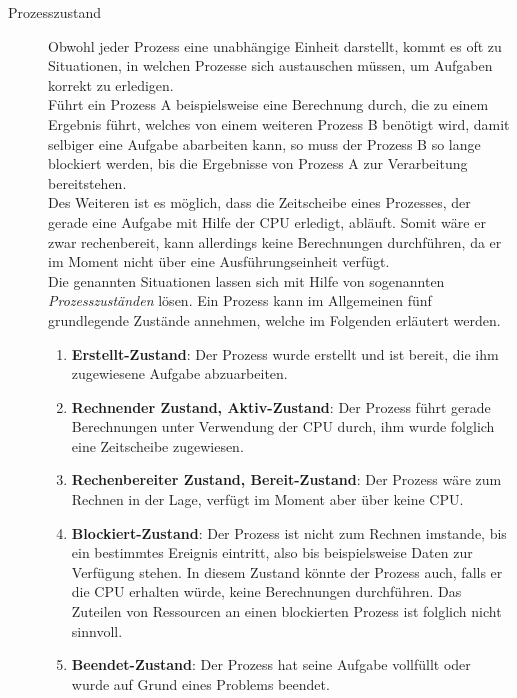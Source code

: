 				\begin{description}
					\item[Prozesszustand]
						\label{Prozesszustand}
						
						Obwohl jeder Prozess eine unabhängige Einheit darstellt, kommt es oft zu Situationen, in welchen Prozesse sich austauschen müssen, um Aufgaben korrekt zu erledigen.\\
						Führt ein Prozess A beispielsweise eine Berechnung durch, die zu einem Ergebnis führt, welches von einem weiteren Prozess B benötigt wird, damit selbiger eine Aufgabe abarbeiten kann, so muss der Prozess B so lange blockiert werden, bis die Ergebnisse von Prozess A zur Verarbeitung bereitstehen.\\
						Des Weiteren ist es möglich, dass die Zeitscheibe eines Prozesses, der gerade eine Aufgabe mit Hilfe der CPU erledigt, abläuft. Somit wäre er zwar rechenbereit, kann allerdings keine Berechnungen durchführen, da er im Moment nicht über eine Ausführungseinheit verfügt.\\
						Die genannten Situationen lassen sich mit Hilfe von sogenannten \textit{Prozesszuständen} lösen. Ein Prozess kann im Allgemeinen fünf grundlegende Zustände annehmen, welche im Folgenden erläutert werden.
						
						\begin{enumerate}
							\item \textbf{Erstellt-Zustand}: Der Prozess wurde erstellt und ist bereit, die ihm zugewiesene Aufgabe abzuarbeiten.
							\item \textbf{Rechnender Zustand, Aktiv-Zustand}: Der Prozess führt gerade Berechnungen unter Verwendung der CPU durch, ihm wurde folglich eine Zeitscheibe zugewiesen.
							\item \textbf{Rechenbereiter Zustand, Bereit-Zustand}: Der Prozess wäre zum Rechnen in der Lage, verfügt im Moment aber über keine CPU.
							\item \textbf{Blockiert-Zustand}: Der Prozess ist nicht zum Rechnen imstande, bis ein bestimmtes Ereignis eintritt, also bis beispielsweise Daten zur Verfügung stehen. In diesem Zustand könnte der Prozess auch, falls er die CPU erhalten würde, keine Berechnungen durchführen. Das Zuteilen von Ressourcen an einen blockierten Prozess ist folglich nicht sinnvoll.
							\item \textbf{Beendet-Zustand}: Der Prozess hat seine Aufgabe vollfüllt oder wurde auf Grund eines Problems beendet.
						\end{enumerate}
					

\end{description}

